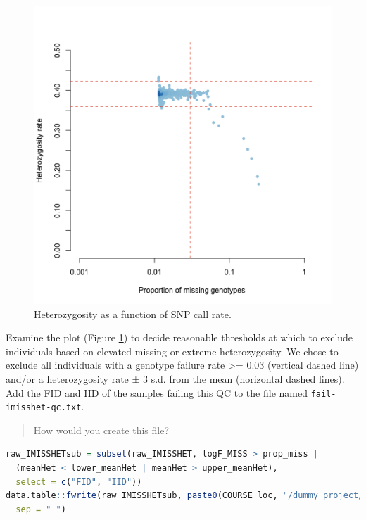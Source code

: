 \documentclass[
]{book}
\newcommand{\passthrough}[1]{#1}
\begin{document}
\begin{figure}[H]

{\centering \includegraphics[width=6.67in]{img/_gwas_dummy/show-heterozygosity} 

}

\caption{Heterozygosity as a function of SNP call rate.}\label{fig:show-heterozygosity}
\end{figure}

Examine the plot (Figure \ref{fig:show-heterozygosity}) to decide reasonable thresholds at which to exclude individuals based on elevated missing or extreme heterozygosity. We chose to exclude all individuals with a genotype failure rate \textgreater= 0.03 (vertical dashed line) and/or a heterozygosity rate ± 3 s.d. from the mean (horizontal dashed lines). Add the FID and IID of the samples failing this QC to the file named \passthrough{\lstinline!fail-imisshet-qc.txt!}.

\begin{quote}
How would you create this file?
\end{quote}

\begin{lstlisting}[language=R]
raw_IMISSHETsub = subset(raw_IMISSHET, logF_MISS > prop_miss |
  (meanHet < lower_meanHet | meanHet > upper_meanHet),
  select = c("FID", "IID"))
data.table::fwrite(raw_IMISSHETsub, paste0(COURSE_loc, "/dummy_project/fail-raw_IMISSHETsub.txt"),
  sep = " ")
\end{lstlisting}
\end{document}
